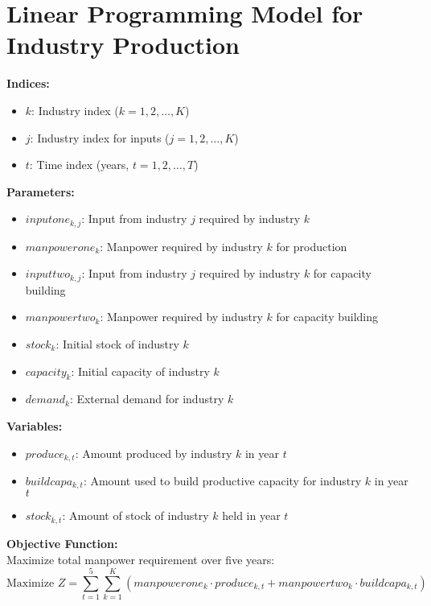 \documentclass{article}
\begin{document}
\section*{Linear Programming Model for Industry Production}

\textbf{Indices:} \\
\begin{itemize}
    \item $k$: Industry index ($k = 1, 2, \ldots, K$)
    \item $j$: Industry index for inputs ($j = 1, 2, \ldots, K$)
    \item $t$: Time index (years, $t = 1, 2, \ldots, T$)
\end{itemize}

\textbf{Parameters:} \\
\begin{itemize}
    \item $inputone_{k, j}$: Input from industry $j$ required by industry $k$
    \item $manpowerone_{k}$: Manpower required by industry $k$ for production
    \item $inputtwo_{k, j}$: Input from industry $j$ required by industry $k$ for capacity building
    \item $manpowertwo_{k}$: Manpower required by industry $k$ for capacity building
    \item $stock_{k}$: Initial stock of industry $k$
    \item $capacity_{k}$: Initial capacity of industry $k$
    \item $demand_{k}$: External demand for industry $k$
\end{itemize}

\textbf{Variables:} \\
\begin{itemize}
    \item $produce_{k, t}$: Amount produced by industry $k$ in year $t$
    \item $buildcapa_{k, t}$: Amount used to build productive capacity for industry $k$ in year $t$
    \item $stock_{k, t}$: Amount of stock of industry $k$ held in year $t$
\end{itemize}

\textbf{Objective Function:} \\
Maximize total manpower requirement over five years:
\[
\text{Maximize } Z = \sum_{t=1}^{5} \sum_{k=1}^{K} (manpowerone_k \cdot produce_{k, t} + manpowertwo_k \cdot buildcapa_{k, t})
\]
\end{document}
